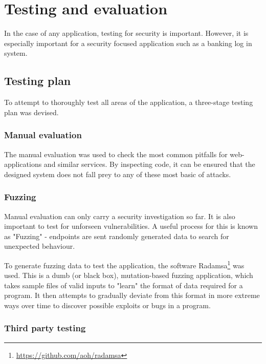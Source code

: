 \section{Testing and evaluation}

In the case of any application, testing for security is important. However, it is especially important for a security focused application such as a banking log in system. 

\subsection{Testing plan}

To attempt to thoroughly test all areas of the application, a three-stage testing plan was devised. 

\subsubsection{Manual evaluation}\label{manualEvaluation}

The manual evaluation was used to check the most common pitfalls for web-applications and similar services. By inspecting code, it can be ensured that the designed system does not fall prey to any of these most basic of attacks.

\subsubsection{Fuzzing}\label{fuzzing}

Manual evaluation can only carry a security investigation so far. It is also important to test for unforseen vulnerabilities. A useful process for this is known as "Fuzzing" - endpoints are sent randomly generated data to search for unexpected behaviour.

To generate fuzzing data to test the application, the software Radamsa\footnote{
    \url{https://github.com/aoh/radamsa}
} was used. This is a dumb (or black box), mutation-based fuzzing application, which takes sample files of valid inputs to "learn" the format of data required for a program. It then attempts to gradually deviate from this format in more extreme ways over time to discover possible exploits or bugs in a program.



\subsubsection{Third party testing}


